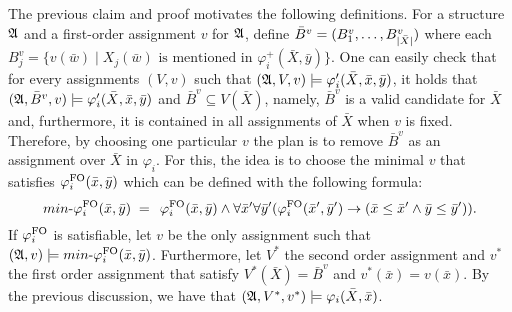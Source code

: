 The previous claim and proof motivates the following definitions.
For a structure $\mathfrak{A}$ and a first-order assignment $v$ for $\mathfrak{A}$, define $\bar{B}^v = (B^v_1,\ldots,B^v_{\vert \bar{X} \vert})$ where each $B^v_j = \{v(\bar{w}) \mid \text{$X_j(\bar{w})$ is mentioned in $\varphi^{+}_i(\bar{X},\bar{y})$}\}$.
One can easily check that for every assignments $(V, v)$ such that $(\mathfrak{A},V,v)\models \varphi_i'(\bar{X}, \bar{x}, \bar{y})$, it holds that $(\mathfrak{A},\bar{B}^v,v)\models \varphi_i'(\bar{X}, \bar{x}, \bar{y})$ and $\bar{B}^v \subseteq V(\bar{X})$, namely, $\bar{B}^v$ is a valid candidate for $\bar{X}$ and, furthermore, it is contained in all assignments of $\bar{X}$ when $v$ is fixed.
Therefore, by choosing one particular $v$ the plan is to remove $\bar{B}^v$ as an assignment over $\bar{X}$ in $\varphi_i$. 
For this, the idea is to choose the minimal $v$ that satisfies $\varphi^{{\rm FO}}_i(\bar{x},\bar{y})$ which can be defined with the following formula:
$$
\text{$min$-}\varphi^{{\rm FO}}_i(\bar{x}, \bar{y}) \; = \;  \,\varphi_i^{{\rm FO}}(\bar{x},\bar{y})\wedge\forall\bar{x}'\forall\bar{y}'(\varphi_i^{{\rm FO}}(\bar{x}',\bar{y}')\to ( \bar{x}\leq\bar{x}' \wedge  \bar{y}\leq\bar{y}')).
$$ 
If $\varphi^{{\rm FO}}_i$ is satisfiable, let $v$ be the only assignment such that  $(\mathfrak{A},v)\models \text{$min$-}\varphi^{{\rm FO}}_i(\bar{x}, \bar{y})$. 
Furthermore, let $V^*$ the second order assignment and $v^*$ the first order assignment that satisfy $V^*(\bar{X}) = \bar{B}^{v}$ and $v^*(\bar{x}) = v(\bar{x})$.
By the previous discussion, we have that $(\mathfrak{A},V^*,v^*)\models\varphi_i(\bar{X},\bar{x})$.

